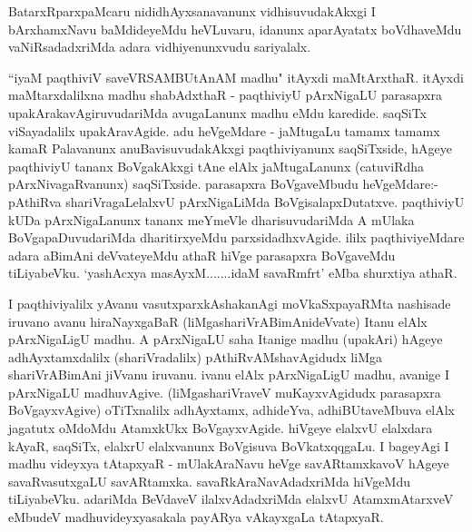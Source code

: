 \begin{center}


\end{center}

\begin{artha}
BatarxRparxpaMcaru nididhAyxsanavanunx vidhisuvudakAkxgi I bArxhamxNavu baMdide\-yeMdu 
heVLuvaru, idanunx aparAyatatx boVdhaveMdu vaNiRsadadxriMda adara vidhiyenunxvudu
sariyalalx.
\end{artha}

\begin{artha}
``iyaM paqthiviV saveVRSAMBUtAnAM madhu" itAyxdi maMtArxthaR. itAyxdi maMtarxdalilxna madhu shabAdxthaR - paqthiviyU 
pArxNigaLU parasapxra upakArakavAgiruvudariMda avugaLanunx madhu eMdu karedide. saqSiTx viSayadalilx upakAravAgide. adu heVgeMdare - jaMtugaLu tamamx tamamx kamaR Palavanunx 
anuBavisuvudakAkxgi paqthiviyanunx saqSiTxside, hAgeye paqthiviyU tananx BoVgakAkxgi tAne 
elAlx jaMtugaLanunx (catuviRdha pArxNivagaRvanunx) saqSiTxside. parasapxra BoVgaveMbudu 
heVgeMdare:- pAthiRva shariVragaLelalxvU pArxNigaLiMda BoVgisalapxDutatxve. paqthiviyU 
kUDa pArxNigaLanunx tananx meYmeVle dharisuvudariMda A mUlaka BoVgapaDuvudariMda 
dharitirxyeMdu parxsidadhxvAgide. ililx paqthiviyeMdare adara aBimAni deVvateyeMdu athaR hiVge parasapxra BoVgaveMdu tiLiyabeVku. `yashAcxya masAyxM.......idaM savaRmfrt' eMba shurxtiya athaR. 
\end{artha}

\begin{center}


\end{center}

\begin{artha}
I paqthiviyalilx yAvanu vasutxparxkAshakanAgi moVkaSxpayaRMta nashisade iruvano avanu hiraNayxgaBaR (liMgashariVrABimAnideVvate) Itanu elAlx pArxNigaLigU madhu. A pArxNigaLU saha Itanige madhu (upakAri) hAgeye adhAyxtamxdalilx (shariVradalilx) pAthiRvAMshavAgidudx liMga shariVrABimAni jiVvanu iruvanu. ivanu elAlx pArxNigaLigU madhu, avanige I pArxNigaLU madhuvAgive. (liMgashariVraveV muKayxvAgidudx parasapxra BoVgayxvAgive) oTiTxnalilx adhAyxtamx, adhideYva, adhiBUtaveMbuva elAlx jagatutx oMdoMdu AtamxkUkx BoVgayxvAgide. hiVgeye elalxvU elalxdara kAyaR, saqSiTx, elalxrU elalxvanunx BoVgisuva BoVkatxqqgaLu. I bageyAgi I madhu videyxya tAtapxyaR - mUlakAraNavu heVge savARtamxkavoV hAgeye savaRvasutxgaLU savARtamxka. savaRkAraNavAdadxriMda hiVgeMdu tiLiyabeVku. adariMda BeVdaveV ilalxvAdadxriMda elalxvU AtamxmAtarxveV eMbudeV madhuvideyxyasakala payARya vAkayxgaLa tAtapxyaR.
\end{artha}

